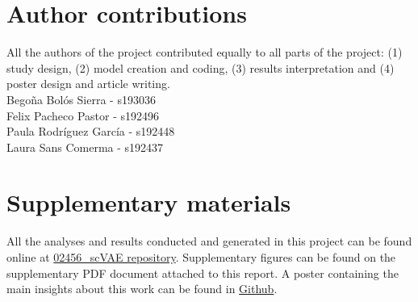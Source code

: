 \documentclass{article}
\begin{document}
\section{Author contributions}

\noindent All the authors of the project contributed equally to all parts of the project: (1) study design, (2) model creation and coding, (3) results interpretation and (4) poster design and article writing. \\

\noindent Begoña Bolós Sierra -  s193036\\
Felix Pacheco Pastor - s192496\\
Paula Rodríguez García - s192448\\
Laura Sans Comerma - s192437

\section{Supplementary materials}
All the analyses and results conducted and generated in this project can be found online at \href{https://github.com/laurasansc/02456_scVAE}{02456\_scVAE repository}.
Supplementary figures can be found on the supplementary PDF document attached to this report.
A poster containing the main insights about this work can be found in \href{https://github.com/laurasansc/02456_scVAE/blob/main/docs/poster/scVAE_poster.pdf}{Github}.
\newpage


\end{document}
